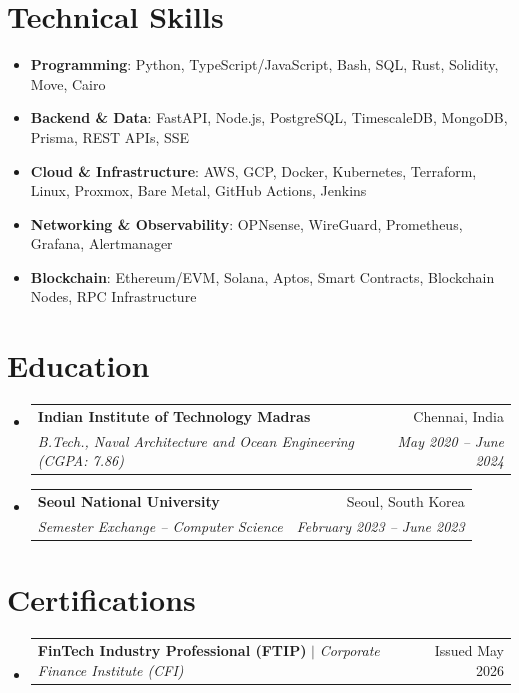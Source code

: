 \documentclass[letterpaper,10pt]{article}
\makeatletter
\newcommand{\resumeSubheading}[4]{
  \item
  \begin{tabular*}{\linewidth}[t]{@{}l@{\extracolsep{\fill}}r@{}}
    \textbf{#1} & \footnotesize #2 \\
    \textit{\small #3} & \textit{\footnotesize #4} \\
  \end{tabular*}\vspace{-3pt}
}
\newcommand{\resumeProjectHeading}[2]{
  \item
  \begin{tabular*}{\linewidth}[t]{@{}l@{\extracolsep{\fill}}r@{}}
    \small #1 & \small #2 \\
  \end{tabular*}\vspace{-3pt}
}
\newcommand{\resumeSubHeadingListStart}{\begin{itemize}[leftmargin=0pt, label={}, itemsep=3pt, parsep=0pt, topsep=0pt, partopsep=0pt]}
\newcommand{\resumeSubHeadingListEnd}{\end{itemize}}
\makeatother
\begin{document}
\section{Technical Skills}
\begin{itemize}[leftmargin=0pt, label={}, itemsep=2pt, parsep=0pt, topsep=2pt, partopsep=0pt]
    \small
    \item \textbf{Programming}: Python, TypeScript/JavaScript, Bash, SQL, Rust, Solidity, Move, Cairo
    \item \textbf{Backend \& Data}: FastAPI, Node.js, PostgreSQL, TimescaleDB, MongoDB, Prisma, REST APIs, SSE
    \item \textbf{Cloud \& Infrastructure}: AWS, GCP, Docker, Kubernetes, Terraform, Linux, Proxmox, Bare Metal, GitHub Actions, Jenkins
    \item \textbf{Networking \& Observability}: OPNsense, WireGuard, Prometheus, Grafana, Alertmanager
    \item \textbf{Blockchain}: Ethereum/EVM, Solana, Aptos, Smart Contracts, Blockchain Nodes, RPC Infrastructure
\end{itemize}

\section{Education}
\resumeSubHeadingListStart
    \resumeSubheading
      {Indian Institute of Technology Madras}{Chennai, India}
      {B.Tech., Naval Architecture and Ocean Engineering (CGPA: 7.86)}{May 2020 -- June 2024}

    \resumeSubheading
      {Seoul National University}{Seoul, South Korea}
      {Semester Exchange -- Computer Science}{February 2023 -- June 2023}
\resumeSubHeadingListEnd

\section{Certifications}
\resumeSubHeadingListStart
    \resumeProjectHeading
      {\textbf{FinTech Industry Professional (FTIP\textregistered)} $|$ \emph{Corporate Finance Institute (CFI)}}{Issued May 2026}
\resumeSubHeadingListEnd
\end{document}
